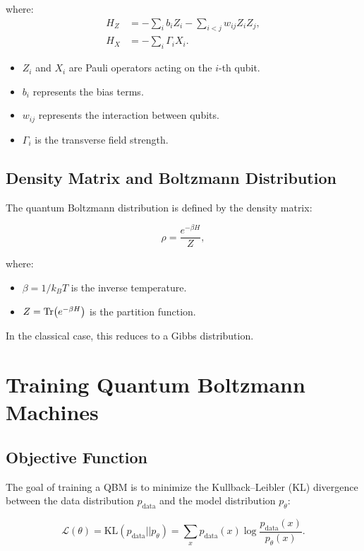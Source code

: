 \documentclass[11pt]{article}
\begin{document}
where:
\begin{align}
    H_Z &= -\sum_{i} b_i Z_i - \sum_{i<j} w_{ij} Z_i Z_j, \\[5pt]
    H_X &= -\sum_i \Gamma_i X_i.
\end{align}

\begin{itemize}
    \item \( Z_i \) and \( X_i \) are Pauli operators acting on the \( i \)-th qubit.
    \item \( b_i \) represents the bias terms.
    \item \( w_{ij} \) represents the interaction between qubits.
    \item \( \Gamma_i \) is the transverse field strength.
\end{itemize}

\subsection{Density Matrix and Boltzmann Distribution}
The quantum Boltzmann distribution is defined by the density matrix:

\begin{equation}
    \rho = \frac{e^{-\beta H}}{Z},
\end{equation}

where:
\begin{itemize}
    \item \( \beta = 1/k_B T \) is the inverse temperature.
    \item \( Z = \Tr(e^{-\beta H}) \) is the partition function.
\end{itemize}

In the classical case, this reduces to a Gibbs distribution.

\section{Training Quantum Boltzmann Machines}
\subsection{Objective Function}
The goal of training a QBM is to minimize the Kullback–Leibler (KL) divergence between the data distribution \( p_{\text{data}} \) and the model distribution \( p_{\theta} \):

\begin{equation}
    \mathcal{L}(\theta) = \text{KL}(p_{\text{data}} || p_{\theta}) = \sum_x p_{\text{data}}(x) \log \frac{p_{\text{data}}(x)}{p_{\theta}(x)}.
\end{equation}
\end{document}
